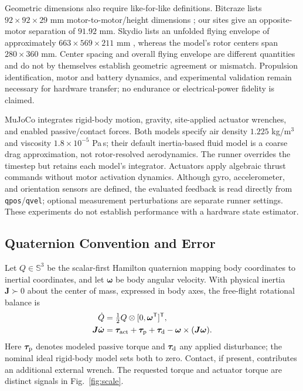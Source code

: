 \documentclass[letterpaper,10pt,conference]{IEEEtran}
\newcommand{\T}{^{\mathsf T}}
\begin{document}
Geometric dimensions also require like-for-like definitions. Bitcraze
lists $92\times92\times29$ mm motor-to-motor/height dimensions
\cite{bitcrazeCF20Specs}; our sites give an opposite-motor separation of
$91.92$ mm. Skydio lists an unfolded flying envelope of approximately
$663\times569\times211$ mm \cite{skydioX2ESpecs}, whereas the model's rotor
centers span $280\times360$ mm. Center spacing and overall flying envelope
are different quantities and do not by themselves establish geometric
agreement or mismatch. Propulsion identification, motor and battery
dynamics, and experimental validation remain necessary for hardware
transfer; no endurance or electrical-power fidelity is claimed.

MuJoCo \cite{todorov2012mujoco} integrates rigid-body motion, gravity, site-applied actuator
wrenches, and enabled passive/contact forces. Both models specify air
density $1.225$ kg/m$^3$ and viscosity $1.8\times10^{-5}$ Pa\,s; their
default inertia-based fluid model \cite{mujocoFluid} is a coarse drag approximation, not
rotor-resolved aerodynamics. The runner overrides the timestep but retains
each model's integrator. Actuators apply algebraic thrust commands without
motor activation dynamics. Although gyro, accelerometer, and orientation
sensors are defined, the evaluated feedback is read directly from
\texttt{qpos}/\texttt{qvel}; optional measurement perturbations are separate
runner settings. These experiments do not establish performance with a
hardware state estimator.

%

\subsection{Quaternion Convention and Error}
Let $Q\in\mathbb S^3$ be the scalar-first Hamilton quaternion mapping body
coordinates to inertial coordinates, and let $\bm\omega$ be body angular
velocity. With physical inertia $\bm J\succ0$ about the center of mass,
expressed in body axes, the free-flight rotational balance is
\begin{align}
 \dot Q&=\tfrac12 Q\otimes[0,\bm\omega\T]\T,\\
 \bm J\dot{\bm\omega}&=\bm\tau_{\rm act}+\bm\tau_{\rm p}
       +\bm\tau_{\rm d}-\bm\omega\times(\bm J\bm\omega).
 \label{eq:plant}
\end{align}
Here $\bm\tau_{\rm p}$ denotes modeled passive torque and
$\bm\tau_{\rm d}$ any applied disturbance; the nominal ideal rigid-body
model sets both to zero. Contact, if present, contributes an additional
external wrench. The requested torque and actuator torque are distinct
signals in Fig.~\ref{fig:scale}.
\end{document}
